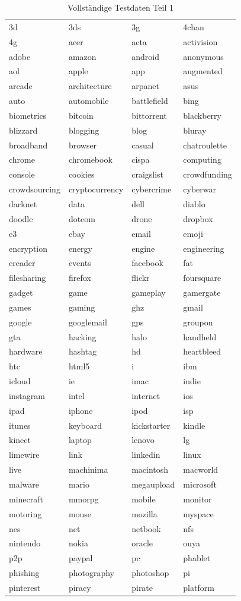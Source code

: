 \documentclass[12pt,a4paper]{report}
\begin{document}
\begin{table}[H]
\caption{Vollständige Testdaten Teil 1}
\begin{center}
\begin{tabular}{l|l|l|l}
3d & 3ds & 3g & 4chan\\
4g & acer & acta & activision\\
adobe & amazon & android & anonymous\\
aol & apple & app & augmented\\
arcade & architecture & arpanet & asus\\
auto & automobile & battlefield & bing\\
biometrics & bitcoin & bittorrent & blackberry\\
blizzard & blogging & blog & bluray\\
broadband & browser & casual & chatroulette\\
chrome & chromebook & cispa & computing\\
console & cookies & craigslist & crowdfunding\\
crowdsourcing & cryptocurrency & cybercrime & cyberwar\\
darknet & data & dell & diablo\\
doodle & dotcom & drone & dropbox\\
e3 & ebay & email & emoji\\
encryption & energy & engine & engineering\\
ereader & events & facebook & fat\\
filesharing & firefox & flickr & foursquare\\
gadget & game & gameplay & gamergate\\
games & gaming & ghz & gmail\\
google & googlemail & gps & groupon\\
gta & hacking & halo & handheld\\
hardware & hashtag & hd & heartbleed\\
htc & html5 & i & ibm\\
icloud & ie & imac & indie\\
instagram & intel & internet & ios\\
ipad & iphone & ipod & isp\\
itunes & keyboard & kickstarter & kindle\\
kinect & laptop & lenovo & lg\\
limewire & link & linkedin & linux\\
live & machinima & macintosh & macworld\\
malware & mario & megaupload & microsoft\\
minecraft & mmorpg & mobile & monitor\\
motoring & mouse & mozilla & myspace\\
nes & net & netbook & nfs\\
nintendo & nokia & oracle & ouya\\
p2p & paypal & pc & phablet\\
phishing & photography & photoshop & pi\\
pinterest & piracy & pirate & platform\\


\end{tabular}
\end{center}
\end{table}
\end{document}
